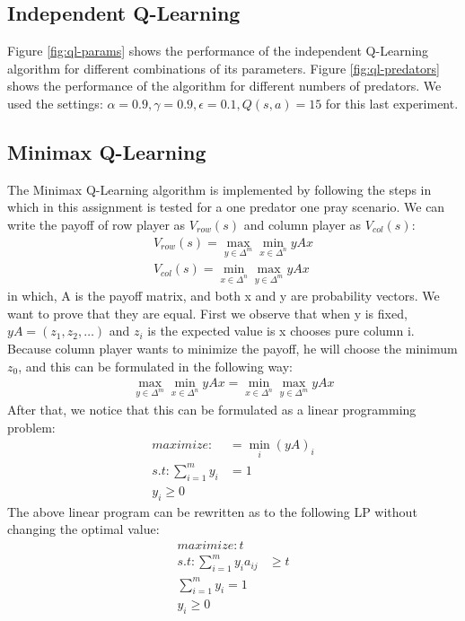 \documentclass[a4paper,12pt]{article}
\begin{document}
\subsection{Independent Q-Learning}

Figure \ref{fig:ql-params} shows the performance of the independent Q-Learning algorithm for different combinations of its parameters. Figure \ref{fig:ql-predators} shows the performance of the algorithm for different numbers of predators. We used the settings: $\alpha = 0.9, \gamma = 0.9, \epsilon = 0.1, Q(s, a) = 15$ for this last experiment.

\subsection{Minimax Q-Learning}
The Minimax Q-Learning algorithm is implemented by following the steps in \cite{hk} which in this assignment is tested for a one predator one pray scenario. We can write the payoff of row player as $V_{row}(s)$ and column player as $V_{col}(s)$:
\begin{align}
 V_{row}(s) = \max_{y\in \Delta^m} \min_{x\in \Delta^n} yAx \\
 V_{col}(s) = \min_{x\in \Delta^n} \max_{y\in \Delta^m} yAx
\end{align}
in which, A is the payoff matrix, and both x and y are probability vectors. We want to prove that they are equal. First we observe that when y is fixed, $yA = (z_1,z_2, \dots)$ and $z_i$ is the expected value is x chooses pure column i. Because column player wants to minimize the payoff, he will choose the minimum $ z_0 $, and this can be formulated in the following way:
\begin{align}
\max_{y\in \Delta^m} \min_{x\in \Delta^n} yAx = \min_{x\in \Delta^n} \max_{y\in \Delta^m} yAx
\end{align}
After that, we notice that this can be formulated as a linear programming problem:
\begin{align}
maximize : &= \min_i (yA)_i \\
s.t : \sum_{i=1}^{m}y_i &= 1 \\
y_i \geq 0
\end{align}
The above linear program can be rewritten as to the following LP without changing the optimal value:
\begin{align}
maximize : t \\
s.t : \sum_{i=1}^{m}y_i a_{ij} &\geq t \\
\sum_{i=1}^{m}y_i = 1 \\
y_i \geq 0
\end{align}
\end{document}
